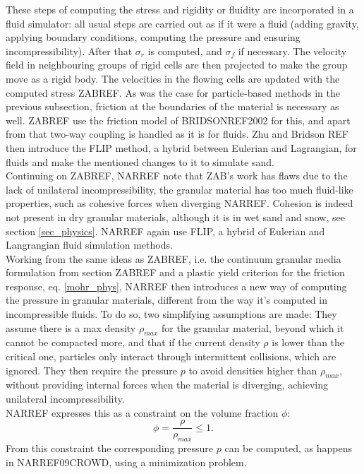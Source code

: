 These steps of computing the stress and rigidity or fluidity are incorporated in a fluid simulator: all usual steps are carried out as if it were a fluid (adding gravity, applying boundary conditions, computing the pressure and ensuring incompressibility). After that $\sigma_r$ is computed, and $\sigma_f$ if necessary. The velocity field in neighbouring groups of rigid cells are then projected to make the group move as a rigid body. The velocities in the flowing cells are updated with the computed stress ZABREF. As was the case for particle-based methods in the previous subsection, friction at the boundaries of the material is necessary as well. ZABREF use the friction model of BRIDSONREF2002 for this, and apart from that two-way coupling is handled as it is for fluids. Zhu and Bridson REF then introduce the FLIP method, a hybrid between Eulerian and Lagrangian, for fluids and make the mentioned changes to it to simulate sand.\\

Continuing on ZABREF, NARREF note that ZAB's work has flaws due to the lack of unilateral incompressibility, the granular material has too much fluid-like properties,  such as cohesive forces when diverging NARREF. Cohesion is indeed not present in dry granular materials, although it is in wet sand and snow, see section \ref{sec_physics}. NARREF again use FLIP, a hybrid of Eulerian and Langrangian fluid simulation methods.\\

Working from the same ideas as ZABREF, i.e. the continuum granular media formulation from section ZABREF and a plastic yield criterion for the friction response, eq. \eqref{mohr_phys}, NARREF then introduces a new way of computing the pressure in granular materials, different from the way it's computed in incompressible fluids. To do so, two simplifying assumptions are made: They assume there is a max density $\rho_{max}$ for the granular material, beyond which it cannot be compacted more, and that if the current density $\rho$ is lower than the critical one, particles only interact through intermittent collisions, which are ignored. They then require the pressure $p$ to avoid densities higher than $\rho_{max}$, without providing internal forces when the material is diverging, achieving unilateral incompressibility.\\

NARREF expresses this as a constraint on the volume fraction $\phi$:
\begin{equation}
\phi = \frac{\rho}{\rho_{max}} \leq 1.
\end{equation}
From this constraint the corresponding pressure $p$ can be computed, as happens in NARREF09CROWD, using a minimization problem.\\

